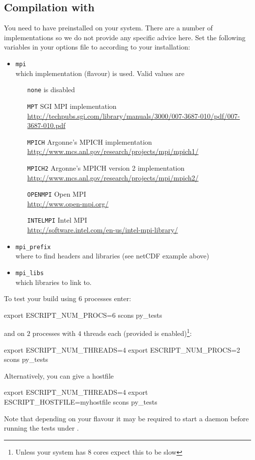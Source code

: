 \subsection{Compilation with \mpi}
You need to have \mpi preinstalled on your system.
There are a number of implementations so we do not provide any specific advice
here.
Set the following variables in your options file to according to your
installation:
\begin{itemize}
 \item \texttt{mpi} \\
    which \mpi implementation (flavour) is used. Valid values are
    \begin{itemize}
        \item[\texttt{none}] \mpi is disabled
        \item[\texttt{MPT}] SGI MPI implementation \\
            \url{http://techpubs.sgi.com/library/manuals/3000/007-3687-010/pdf/007-3687-010.pdf}
        \item[\texttt{MPICH}] Argonne's MPICH implementation \\
            \url{http://www.mcs.anl.gov/research/projects/mpi/mpich1/}
        \item[\texttt{MPICH2}] Argonne's MPICH version 2 implementation \\
            \url{http://www.mcs.anl.gov/research/projects/mpi/mpich2/}
        \item[\texttt{OPENMPI}] Open MPI \\
            \url{http://www.open-mpi.org/}
        \item[\texttt{INTELMPI}] Intel MPI \\
            \url{http://software.intel.com/en-us/intel-mpi-library/}
    \end{itemize}
 \item \texttt{mpi_prefix} \\
    where to find \mpi headers and libraries (see netCDF example above)
 \item \texttt{mpi_libs} \\
    which libraries to link to.
\end{itemize}

To test your build using 6 processes enter:
\begin{shellCode}
export ESCRIPT_NUM_PROCS=6
scons py_tests
\end{shellCode}
and on $2$ processes with $4$ threads each (provided \openmp is enabled)\footnote{Unless your system has $8$ cores expect this to be slow}:
\begin{shellCode}
export ESCRIPT_NUM_THREADS=4
export ESCRIPT_NUM_PROCS=2
scons py_tests
\end{shellCode}
Alternatively, you can give a hostfile
\begin{shellCode}
export ESCRIPT_NUM_THREADS=4
export ESCRIPT_HOSTFILE=myhostfile
scons py_tests
\end{shellCode}
Note that depending on your \mpi flavour it may be required to start a daemon
before running the tests under \mpi.

